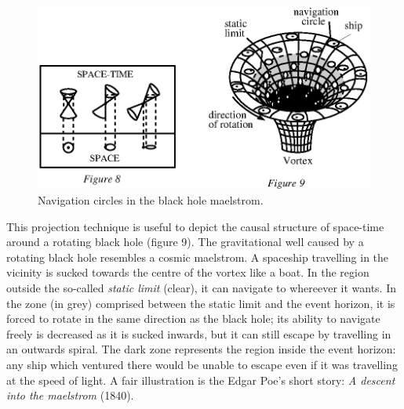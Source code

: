 \documentclass{lamuphys}
\begin{document}
\begin{figure}[tb]
\renewcommand \thefigure {8\&9}
  \begin{center}
    \leavevmode
    \includegraphics{vortex.ps}
    \caption{Navigation circles in the black hole maelstrom.}
  \end{center}
\end{figure}
\setcounter{figure}{9}
This projection
technique is useful to depict the causal structure of space-time around a
rotating black hole (figure 9). The gravitational well caused by a rotating
black hole resembles a cosmic maelstrom. A spaceship travelling in the vicinity is
sucked towards the centre of the vortex like a boat. In the region outside
the so-called {\it static limit} (clear), it can navigate 
to whereever it wants.
In the zone (in grey) comprised between the static limit and the event
horizon, it
is forced to rotate in the same direction as the black hole; its ability to
navigate freely is decreased as it is sucked inwards, but it can still escape
by travelling in an outwards spiral. The dark zone represents the region inside
the event horizon: any ship which ventured there would be unable to escape even
if it was travelling at the speed of light. A fair illustration is the 
Edgar Poe's short
story: {\it A descent into the maelstrom} (1840).
\end{document}
